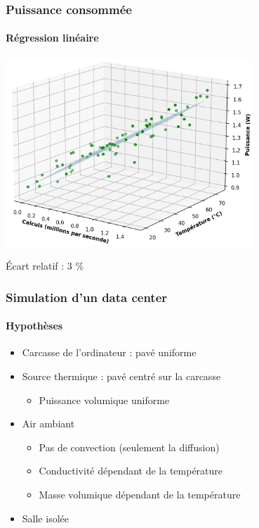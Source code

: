 \documentclass[a4paper,11pt]{beamer}
\begin{document}
\begin{frame}
    \frametitle{Puissance consommée}
    \framesubtitle{Régression linéaire}

    \includegraphics[width=0.7\textwidth]{regression_cube.png}

    \begin{center}
        Écart relatif : 3 \%
    \end{center}
\end{frame}

\begin{frame}
    \frametitle{Simulation d'un data center}
    \framesubtitle{Hypothèses}

    \begin{itemize}
        \item Carcasse de l'ordinateur : pavé uniforme
        \item Source thermique : pavé centré sur la carcasse
        \begin{itemize}
            \item Puissance volumique uniforme
        \end{itemize}
        \item Air ambiant
        \begin{itemize}
            \item Pas de convection (seulement la diffusion)
            \item Conductivité dépendant de la température
            \item Masse volumique dépendant de la température
        \end{itemize}
        \item Salle isolée
    \end{itemize}
\end{frame}
\end{document}
